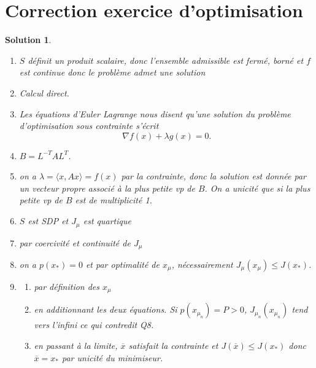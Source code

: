 \documentclass[11pt]{article}
\theoremstyle{exostyle}
\newtheorem{solution}{Solution}
\begin{document}
\newpage
\section*{Correction exercice d’optimisation}

\begin{solution}
 \begin{enumerate}
  \item $S$ définit un produit scalaire, donc l’ensemble admissible est fermé, borné et $f$ est continue donc le problème admet une solution 
  \item Calcul direct.
  \item Les équations d’Euler Lagrange nous disent qu’une solution du problème d’optimisation sous contrainte s’écrit 
  \[
    \nabla f(x) + \lambda g(x)=0.  
  \]
  \item $B = L^{-T} A L^T$.
  \item on a $\lambda = \langle x, A x \rangle = f(x)$ par la contrainte, donc la solution est donnée par un vecteur propre associé à la plus petite vp de $B$.
   On a unicité que si la plus petite vp de $B$ est de multiplicité 1.
   \item $S$ est SDP et $J_\mu$ est quartique
   \item par coercivité et continuité de $J_\mu$
   \item on a $p(x_*) = 0$ et par optimalité de $x_\mu$, nécessairement $J_\mu(x_\mu) \leq J(x_*)$.
   \item \begin{enumerate}
    \item par définition des $x_{\mu}$
    \item en additionnant les deux équations. Si $p(x_{\mu_n}) = P>0$, $J_{\mu_n}(x_{\mu_n})$ tend vers l’infini ce qui contredit Q8.
    \item en passant à la limite, $\overline{x}$ satisfait la contrainte et $J(\overline{x}) \leq J(x_*)$ donc $\overline{x} = x_*$ par unicité du minimiseur.
   \end{enumerate}
 \end{enumerate} 
\end{solution}
\end{document}
